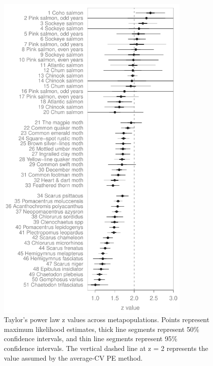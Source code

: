 \begin{figure}[htbp]
  \centering
  \includegraphics[height=6.6in]{prophets/Taylor_z_values.pdf}
  \caption[Taylor's power law z values across metapopulations.]{
    Taylor's power law z values across metapopulations. Points represent maximum
    likelihood estimates, thick line segments represent 50\% confidence
    intervals, and thin line segments represent 95\% confidence intervals. The
    vertical dashed line at z = 2 represents the value assumed by the average-CV
    PE method.
}
\label{fig:z-vals}
\end{figure}


